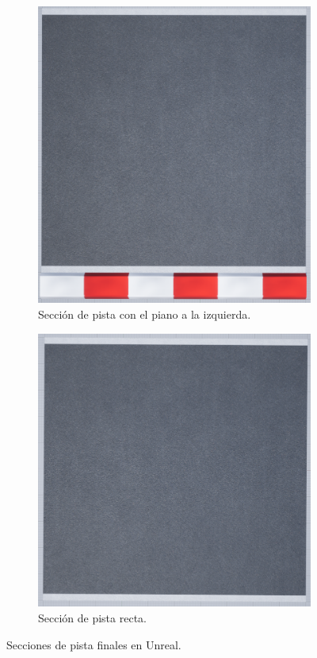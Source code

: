 \begin{figure}[H]
\begin{subfigure}[t]{0.48\textwidth}
        \includegraphics[width=\textwidth]{imagenes/pista/track-final-inverted.png}
        \caption{Sección de pista con el piano a la izquierda.}
        \label{fig:curvafinla3}
    \end{subfigure}
    \par\bigskip
    \begin{subfigure}[t]{0.48\textwidth}
        \centering
        \includegraphics[width=\textwidth]{imagenes/pista/track-straight-final.png}
        \caption{Sección de pista recta.}
        \label{fig:curvafinal1}
    \end{subfigure}

    \caption{Secciones de pista finales en Unreal.}
    \label{fig:seccionespista}
\end{figure}
